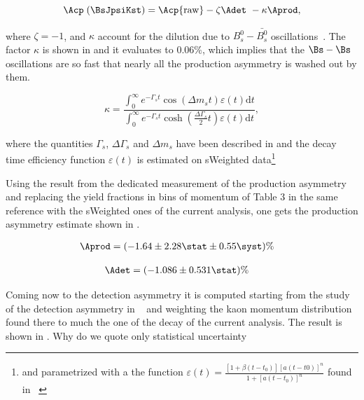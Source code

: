 \begin{equation}
\Acp\;(\BsJpsiKst) = \Acp{\rm raw} - \zeta \Adet\ - \kappa\Aprod,
\label{acp_corrected}
\end{equation}

\noindent where $\zeta = -1$, and $\kappa$ account for the dilution due to $B^0_s-\bar{B^0_s}$
oscillations~\cite{LHCb-PAPER-2013-018}. The factor $\kappa$ is shown in  and it evaluates to $0.06\%$,
which implies that the $\Bs-\Bs$ oscillations are so fast that nearly all the production asymmetry
is washed out by them.

\begin{equation}
 \kappa = \frac{\int_0^\infty  e^{-\Gamma_s t} \cos \!\left( \Delta m_s t \right ) \varepsilon(t)\mathrm{d}t}{\int_0^\infty  e^{-\Gamma_s t} \cosh \left( \frac{\Delta \Gamma_s}{2} t \right ) \varepsilon(t)\mathrm{d}t},
\label{kappa}
\end{equation}

\noindent where the quantities $\Gamma_s$, $\Delta\Gamma_s$ and $\Delta m_s$ have been described in 
and the decay time efficiency function $\varepsilon(t)$ is estimated on sWeighted \BsJpsiKst
data\footnote{and parametrized with a the function $\varepsilon(t)= \frac{[1+\beta(t-t_0)][a(t-t0)]^n}{1+[a(t-t_0)]^n}$ found in ~\cite{LHCb-PAPER-2014-053}}

Using the result from the dedicated \lhcb measurement of the production asymmetry ~\cite{LHCb-PAPER-2014-042}
and replacing the yield fractions in bins of \Bs momentum of Table 3 in the same reference with the sWeighted \BsJpsiKst ones of the current analysis,
one gets the production asymmetry estimate shown in .

\begin{align}
\Aprod &= (-1.64 \pm 2.28 \stat \pm 0.55 \syst)\%
\label{prod_assym}
\end{align}

\begin{align}
\Adet &= (-1.086 \pm 0.531 \stat)\%
\label{det_assym}
\end{align}

\noindent Coming now to the detection asymmetry it is computed starting from the \lhcb study of the detection asymmetry
in ~\cite{LHCb-PAPER-2014-013} and weighting the kaon momentum distribution found there to much the one of the \BsJpsiKst
decay of the current analysis. The result is shown in . {\color{red} Why do we quote only statistical uncertainty}

